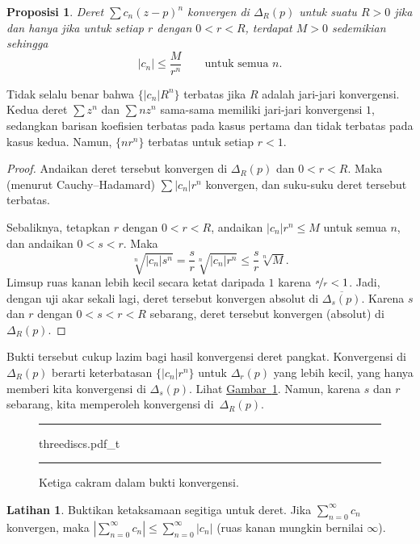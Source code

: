 \documentclass[12pt,openany]{book}
\newcommand{\sabs}[1]{\lvert {#1} \rvert}
\newcommand{\abs}[1]{\left\lvert {#1} \right\rvert}
\theoremstyle{plain}
\newtheorem{prop}[thm]{Proposisi}
\theoremstyle{remark}
\theoremstyle{definition}
\newenvironment{exbox}{%
    \def\FrameCommand{\vrule width 1pt \relax\hspace{10pt}}%
    \MakeFramed{\advance\hsize-\width\FrameRestore}%
}{%
    \endMakeFramed
}
\newenvironment{myfig}{%
\begin{figure}[h!t]
\noindent\rule{\textwidth}{0.5pt}\vspace{12pt}\par\centering}%
{\par\noindent\rule{\textwidth}{0.5pt}
\end{figure}}
\theoremstyle{exercise}
\newtheorem{exercise}{Latihan}[section]
\theoremstyle{example}
\newcommand{\figureref}[1]{\hyperref[#1]{Gambar~\ref*{#1}}}
\begin{document}
\begin{prop} \label{prop:cnrnbounded}
Deret $\sum c_n {(z-p)}^n$ konvergen di $\Delta_{R}(p)$ untuk suatu
$R > 0$ jika dan hanya jika
untuk setiap $r$ dengan
$0 < r < R$, terdapat $M > 0$ sedemikian sehingga
\begin{equation*}
\sabs{c_n} \leq \frac{M}{r^n} \qquad \text{untuk semua } n .
\end{equation*}
\end{prop}

Tidak selalu benar bahwa $\bigl\{ \sabs{c_n} R^n \bigr\}$
terbatas jika $R$ adalah jari-jari konvergensi.
Kedua deret $\sum z^n$ dan $\sum n z^n$ sama-sama memiliki
jari-jari konvergensi $1$, sedangkan barisan koefisien
terbatas pada kasus pertama dan
tidak terbatas pada kasus kedua.  Namun, $\{ n r^n \}$ terbatas untuk setiap $r < 1$.

\begin{proof}
Andaikan deret tersebut konvergen di $\Delta_{R}(p)$ dan
$0 < r < R$.  Maka (menurut Cauchy--Hadamard) $\sum \sabs{c_n}r^n$ konvergen,
dan suku-suku deret tersebut terbatas.

Sebaliknya, tetapkan $r$ dengan $0 < r < R$, andaikan
$\sabs{c_n} r^n \leq M$ untuk semua $n$, dan andaikan $0 < s < r$.
Maka
\begin{equation*}
\sqrt[n]{\sabs{c_n} s^n}=
\frac{s}{r}\sqrt[n]{\sabs{c_n} r^n} \leq \frac{s}{r} \sqrt[n]{M} .
\end{equation*}
Limsup ruas kanan lebih kecil secara ketat daripada $1$
karena $\nicefrac{s}{r} < 1$.
Jadi, dengan uji akar sekali lagi, deret tersebut konvergen absolut di
$\overline{\Delta_s(p)}$.
Karena $s$ dan $r$ dengan $0 < s < r < R$ sebarang,
deret tersebut konvergen (absolut) di $\Delta_R(p)$.
\end{proof}

Bukti tersebut cukup lazim bagi hasil konvergensi deret pangkat.
Konvergensi di $\Delta_R(p)$ berarti keterbatasan
$\{ \sabs{c_n} r^n \}$ untuk $\Delta_r(p)$ yang lebih kecil, yang hanya memberi kita konvergensi
di $\Delta_s(p)$.  Lihat \figureref{fig:threediscs}.  Namun, karena $s$ dan $r$
sebarang, kita memperoleh konvergensi di~$\Delta_R(p)$.
\begin{myfig}
{threediscs.pdf_t}
\caption{Ketiga cakram dalam bukti konvergensi.\label{fig:threediscs}}
\end{myfig}

\begin{exbox}
\begin{exercise}
Buktikan ketaksamaan segitiga untuk deret.  Jika $\sum_{n=0}^\infty c_n$
konvergen, maka $\abs{\sum_{n=0}^\infty c_n} \leq \sum_{n=0}^\infty
\sabs{c_n}$ (ruas kanan mungkin bernilai $\infty$).
\end{exercise}
\end{exbox}
\end{document}

